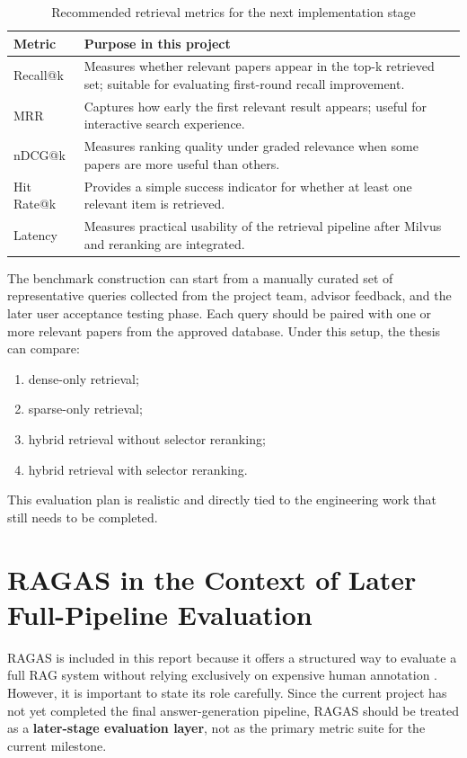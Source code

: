 \documentclass[11pt,a4paper,oneside]{report}
\begin{document}
\begin{table}[htbp]
\centering
\caption{Recommended retrieval metrics for the next implementation stage}
\label{tab:retrieval-metrics}
\begin{tabularx}{\textwidth}{>{\raggedright\arraybackslash}p{3cm} >{\raggedright\arraybackslash}X}
\toprule
Metric & Purpose in this project \\
\midrule
Recall@k & Measures whether relevant papers appear in the top-k retrieved set; suitable for evaluating first-round recall improvement. \\
MRR & Captures how early the first relevant result appears; useful for interactive search experience. \\
nDCG@k & Measures ranking quality under graded relevance when some papers are more useful than others. \\
Hit Rate@k & Provides a simple success indicator for whether at least one relevant item is retrieved. \\
Latency & Measures practical usability of the retrieval pipeline after Milvus and reranking are integrated. \\
\bottomrule
\end{tabularx}
\end{table}

The benchmark construction can start from a manually curated set of representative
queries collected from the project team, advisor feedback, and the later user
acceptance testing phase. Each query should be paired with one or more relevant papers
from the approved database. Under this setup, the thesis can compare:

\begin{enumerate}
  \item dense-only retrieval;
  \item sparse-only retrieval;
  \item hybrid retrieval without selector reranking;
  \item hybrid retrieval with selector reranking.
\end{enumerate}

This evaluation plan is realistic and directly tied to the engineering work that still
needs to be completed.

\section{RAGAS in the Context of Later Full-Pipeline Evaluation}

RAGAS is included in this report because it offers a structured way to evaluate a full
RAG system without relying exclusively on expensive human annotation
\cite{ragas2023}. However, it is important to state its role carefully. Since the
current project has not yet completed the final answer-generation pipeline, RAGAS
should be treated as a \textbf{later-stage evaluation layer}, not as the primary metric
suite for the current milestone.
\end{document}
